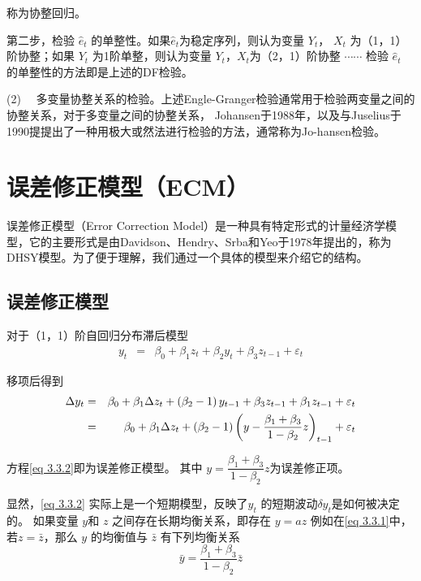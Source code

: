 		称为协整回归。
		
		第二步，检验 $ \hat{e}_{t} $ 的单整性。如果$ \hat{e}_{t} $为稳定序列，则认为变量 $ Y_{t} $， $ X_{t} $
		为（1，1）阶协整；如果 $ Y_{t} $ 为1阶单整，则认为变量 $ Y_{t} $，$ X_{t} $为（2，1）阶协整 $\cdots \cdots $
		检验 $ \hat{e}_{t} $ 的单整性的方法即是上述的DF检验。
		
		(2) \ \ 多变量协整关系的检验。上述Engle-Granger检验通常用于检验两变量之间的协整关系，对于多变量之间的协整关系，
		Johansen于1988年，以及与Juselius于1990提提出了一种用极大或然法进行检验的方法，通常称为Jo-hansen检验。

\section{误差修正模型（ECM）}
	误差修正模型（Error Correction Model）是一种具有特定形式的计量经济学模型，它的主要形式是由Davidson、Hendry、Srba和Yeo于1978年提出的，称为DHSY模型。为了便于理解，我们通过一个具体的模型来介绍它的结构。
	
	\subsection{误差修正模型}	
	
		对于（1，1）阶自回归分布滞后模型
		\vspace{-0.5em}
		\begin{eqnarray}
		y_{t} & = & \beta_{0}+\beta_{1} z_{t}+\beta_{2} y_{t}+\beta_{3} z_{t-1}+\varepsilon_{t}
		\label{eq 3.3.1}
		\end{eqnarray}
		
		移项后得到
		\vspace{-0.5em}
		\begin{eqnarray}
		\Delta y_{t}  & = & \beta_{0}+\beta_{1} \Delta z_{t}+\left(\beta_{2}-1\right) y_{t-1}+\beta_{3} z_{t-1}+\beta_{1} z_{t-1}+\varepsilon_{t} 
		\label{eq 3.3.2} \\
		& = & \beta_{0}+\beta_{1} \Delta z_{t}+\left(\beta_{2}-1\right)\left(y-\dfrac{\beta_{1}+\beta_{3}}{1-\beta_{2}} z\right)_{t-1}+\varepsilon_{t} \notag
		\end{eqnarray}
		
		方程\ref{eq 3.3.2}即为误差修正模型。 其中  $ y =  \dfrac{\beta_{1}+\beta_{3}}{1-\beta_{2}}z $为误差修正项。
		
		显然，\ref{eq 3.3.2} 实际上是一个短期模型，反映了$ y_{t} $ 的短期波动$ \delta y_{t} $是如何被决定的。
		如果变量  $ y $和  $ z $ 之间存在长期均衡关系，即存在 $ y=a z $
		例如在\ref{eq 3.3.1}中，若$ z=\bar{z} $，那么 $ y $ 的均衡值与 $ \bar{z} $ 有下列均衡关系
		\vspace{-0.5em}
		$$ \bar{y}=\frac{\beta_{1}+\beta_{3}}{1-\beta_{2}} \bar{z} $$
		
